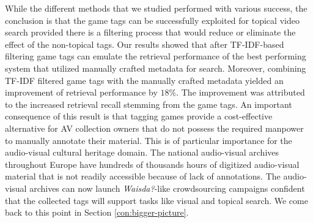 While the different methods that we studied performed with various success, the conclusion is that the
game tags can be successfully exploited for topical video search provided there is a filtering process that would reduce or eliminate the effect of the non-topical tags. Our results showed that after TF-IDF-based filtering game tags can emulate the retrieval performance of the best performing system that utilized manually crafted metadata for search. Moreover, combining TF-IDF filtered game tags with the manually crafted metadata yielded an improvement of retrieval performance by $18\%$. The improvement was attributed to the increased retrieval recall stemming from the game tags. An important consequence of this result is that tagging games provide a cost-effective alternative for AV collection owners that do not possess the required manpower to manually annotate their material. This is of particular importance for the audio-visual cultural heritage domain. The national audio-visual archives throughout Europe have hundreds of thousands hours of digitized audio-visual material that is not readily accessible because of lack of annotations. The audio-visual archives can now launch \textit{Waisda?}-like crowdsourcing campaigns confident that the collected tags will support tasks like visual and topical search. We come back to this point in Section \ref{con:bigger-picture}.
 
